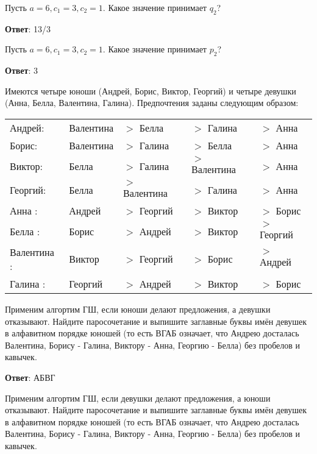 \task
Пусть $a = 6, c_1 = 3, c_2 = 1$. Какое значение принимает $q_2$?

\textbf{Ответ}: 
13/3

\solution %

\task Пусть $a=6, c_1=3, c_2=1$. Какое значение принимает $p_2$?

\textbf{Ответ}: 
3	%

\solution %

\task
Имеются четыре юноши (Андрей, Борис, Виктор, Георгий) и четыре девушки (Анна, Белла, Валентина, Галина). Предпочтения заданы следующим образом:

\begin{tabular}{lllll}
	\hline
	Андрей: &Валентина &$>$ Белла &$>$ Галина &$>$ Анна \\
	
	Борис:&Валентина &$>$ Галина &$>$ Белла &$>$ Анна \\
	
	Виктор:&Белла &$>$ Галина &$>$ Валентина &$>$ Анна \\
	
	Георгий:&Белла&$>$ Валентина &$>$ Галина &$>$ Анна \\
	
	Анна :&Андрей &$>$ Георгий &$>$ Виктор &$>$ Борис \\
	
	Белла :&Борис &$>$ Андрей &$>$ Виктор &$>$ Георгий \\
	
	Валентина :&Виктор &$>$ Георгий &$>$ Борис &$>$ Андрей \\
	
	Галина :&Георгий &$>$ Андрей &$>$ Виктор &$>$ Борис \\
	\hline
\end{tabular}

Применим алгортим ГШ, если юноши делают предложения, а девушки отказывают. Найдите паросочетание и выпишите заглавные буквы имён девушек в алфавитном порядке юношей (то есть ВГАБ означает, что Андрею досталась Валентина, Борису - Галина, Виктору - Анна, Георгию - Белла) без пробелов и кавычек.

\textbf{Ответ}: 
АБВГ	%

\solution %

\task 
Применим алгортим ГШ, если девушки делают предложения, а юноши отказывают. Найдите паросочетание и выпишите заглавные буквы имён девушек в алфавитном порядке юношей (то есть ВГАБ означает, что Андрею досталась Валентина, Борису - Галина, Виктору - Анна, Георгию - Белла) без пробелов и кавычек.


